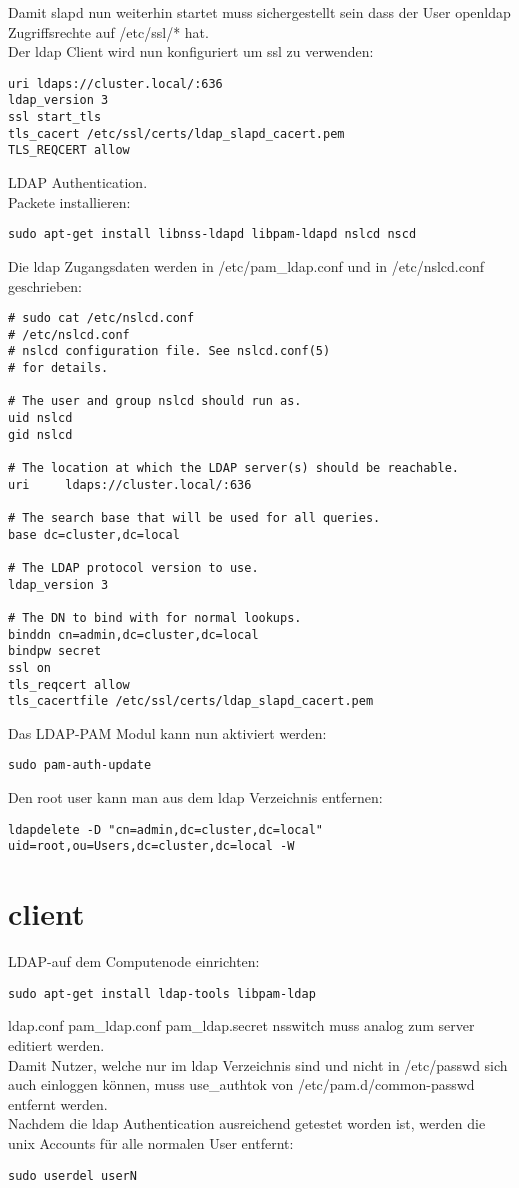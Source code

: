 Damit slapd nun weiterhin startet muss sichergestellt sein dass der User openldap Zugriffsrechte auf /etc/ssl/* hat.\\
Der ldap Client wird nun konfiguriert um ssl zu verwenden:
\begin{lstlisting}[style=Bash]
uri ldaps://cluster.local/:636
ldap_version 3
ssl start_tls
tls_cacert /etc/ssl/certs/ldap_slapd_cacert.pem
TLS_REQCERT allow
\end{lstlisting}
LDAP Authentication.\\
Packete installieren:
\begin{lstlisting}[style=Bash]
sudo apt-get install libnss-ldapd libpam-ldapd nslcd nscd
\end{lstlisting}
Die ldap Zugangsdaten werden in /etc/pam\_ldap.conf und in /etc/nslcd.conf geschrieben:
\begin{lstlisting}[style=Bash]
# sudo cat /etc/nslcd.conf 
# /etc/nslcd.conf
# nslcd configuration file. See nslcd.conf(5)
# for details.

# The user and group nslcd should run as.
uid nslcd
gid nslcd

# The location at which the LDAP server(s) should be reachable.
uri     ldaps://cluster.local/:636

# The search base that will be used for all queries.
base dc=cluster,dc=local

# The LDAP protocol version to use.
ldap_version 3

# The DN to bind with for normal lookups.
binddn cn=admin,dc=cluster,dc=local
bindpw secret
ssl on
tls_reqcert allow
tls_cacertfile /etc/ssl/certs/ldap_slapd_cacert.pem
\end{lstlisting}
Das LDAP-PAM Modul kann nun aktiviert werden: 
\begin{lstlisting}[style=Bash]
sudo pam-auth-update
\end{lstlisting}
Den root user kann man aus dem ldap Verzeichnis entfernen:
\begin{lstlisting}[style=Bash]
ldapdelete -D "cn=admin,dc=cluster,dc=local" uid=root,ou=Users,dc=cluster,dc=local -W
\end{lstlisting}
\section{client}
LDAP-auf dem Computenode einrichten:
\begin{lstlisting}[style=Bash]
sudo apt-get install ldap-tools libpam-ldap
\end{lstlisting}
{ldap.conf pam\_ldap.conf pam\_ldap.secret nsswitch} muss analog zum server editiert werden.\\
Damit Nutzer, welche nur im ldap Verzeichnis sind und nicht in /etc/passwd sich auch einloggen können, muss use\_authtok von /etc/pam.d/common-passwd entfernt werden.\\
Nachdem die ldap Authentication ausreichend getestet worden ist, werden die unix Accounts für alle normalen User entfernt: 
\begin{lstlisting}[style=Bash]
sudo userdel userN
\end{lstlisting}
